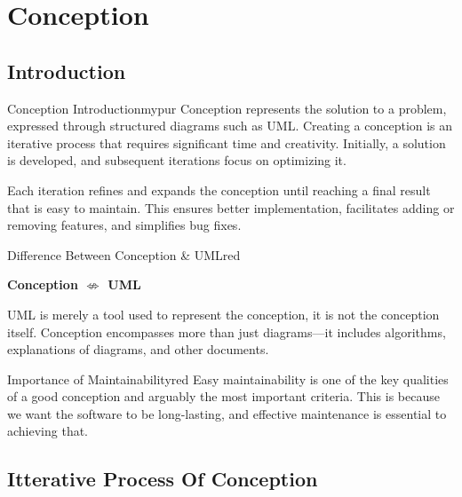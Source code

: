 \section{Conception}

\subsection{Introduction}
\begin{prettyBox}{Conception Introduction}{mypur}
Conception represents the solution to a problem, expressed through structured diagrams such as UML.
Creating a conception is an iterative process that requires significant time and creativity.
Initially, a solution is developed, and subsequent iterations focus on optimizing it.

\vspace{0.15cm}
Each iteration refines and expands the conception until reaching a final result that is easy to
maintain. This ensures better implementation, facilitates adding or removing features, and 
simplifies bug fixes.

\end{prettyBox}

\vspace{0.5cm}
\begin{prettyBox}{Difference Between Conception \& UML}{red} 
    \begin{center} 
        \textbf{Conception $\not\Leftrightarrow$ UML} 
     \end{center}
UML is merely a tool used to represent the conception, it is not the conception itself. 
Conception encompasses more than just diagrams—it includes algorithms, explanations of 
diagrams, and other documents.
\end{prettyBox}


\vspace{0.5cm}
\begin{prettyBox}{Importance of Maintainability}{red} 
Easy maintainability is one of the key qualities of a good conception and arguably the most
important criteria. This is because we want the software to be long-lasting, and effective 
maintenance is essential to achieving that.
\end{prettyBox}

\vspace{0.5cm}
\subsection{Itterative Process Of Conception}

